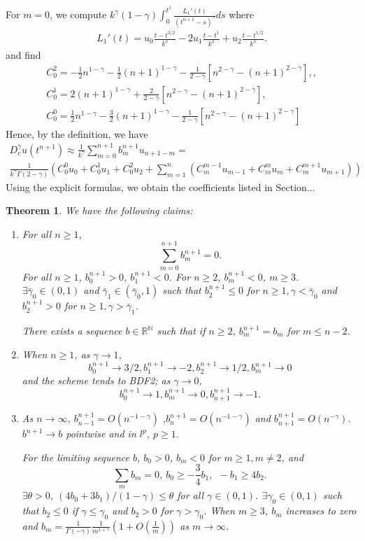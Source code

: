 \documentclass[11pt]{article} %
\newtheorem{thm}{Theorem}
\begin{document}
For $m=0$, we compute $k^{\gamma}(1-\gamma)\int_0^{t^1}\frac{L_1'(t)}{(t^{n+1}-s)^{\gamma}}ds$ where
\begin{gather*}
L_1'(t)=u_{0}\frac{t-t^{3/2}}{k^2}-2u_1\frac{t-t^1}{k^2}+u_{2}\frac{t-t^{1/2}}{k^2}.
\end{gather*}
and find
\begin{gather*}
C_0^2=-\frac{1}{2}n^{1-\gamma}-\frac{1}{2}(n+1)^{1-\gamma}
-\frac{1}{2-\gamma}[n^{2-\gamma}-(n+1)^{2-\gamma}],, \\
C_0^1=2(n+1)^{1-\gamma}
+\frac{2}{2-\gamma}[n^{2-\gamma}-(n+1)^{2-\gamma}], \\
C_0^0=\frac{1}{2}n^{1-\gamma}-\frac{3}{2}(n+1)^{1-\gamma}
-\frac{1}{2-\gamma}[n^{2-\gamma}-(n+1)^{2-\gamma}]
\end{gather*}
Hence, by the definition, we have
\begin{multline*}
D_c^{\gamma}u(t^{n+1})\approx \frac{1}{k^{\gamma}}\sum_{m=0}^{n+1}b_{m}^{n+1}u_{n+1-m}=\\
\frac{1}{k^{\gamma}\Gamma(2-\gamma)}(C_0^0u_0+C_0^1u_1+C_0^2u_2+\sum_{m=1}^n(C_m^{m-1}u_{m-1}
+C_m^{m}u_m+C_m^{m+1}u_{m+1}))
\end{multline*}
Using the explicit formulas, we obtain the coefficients listed in Section...


\begin{thm}
We have the following claims:
\begin{enumerate}
\item 
For all $n\ge 1$, $$
\sum_{m=0}^{n+1}b_m^{n+1}=0.
$$ 
For all $n\ge 1$, $b_0^{n+1}>0$, $b_1^{n+1}<0$. For $n\ge 2$, $b_m^{n+1}<0$, $m\ge 3$. $\exists \bar{\gamma}_0\in (0, 1)$ and $\bar{\gamma}_1\in(\bar{\gamma}_0, 1)$ such that $b_2^{n+1}\le 0$ for $n\ge 1, \gamma<\bar{\gamma}_0$ and $b_2^{n+1}>0$ for $n\ge 1, \gamma>\bar{\gamma}_1$.


There exists a sequence $b\in \mathbb{R}^{\mathbb{N}}$ such that if $n\ge 2$, $b_m^{n+1}=b_m$ for $m\le n-2$.

\item 
When $n\ge 1$, as $\gamma\to 1$, $$
b_0^{n+1}\to 3/2, b_1^{n+1}\to -2, b_2^{n+1}\to 1/2, b_m^{n+1}\to 0
$$
and the scheme tends to BDF2; as $\gamma\to 0$, $$
b_0^{n+1}\to 1, b_m^{n+1}\to 0 ,b_{n+1}^{n+1}\to -1.
$$
\item As $n\to \infty$, $b_{n-1}^{n+1}=O(n^{-1-\gamma})$ ,$b_n^{n+1}=O(n^{-1-\gamma})$ and $b_{n+1}^{n+1}=O(n^{-\gamma})$. $b^{n+1}\to b$ pointwise and in $l^p$, $p\ge 1$. 

For the limiting sequence $b$, $b_0>0$, $b_m<0$
for $m\ge 1, m\neq 2$, and $$
\sum_m b_m=0,\ 
b_0\ge -\frac{3}{4}b_1,\ \ -b_1\ge 4b_2.
$$
$\exists \theta>0$, $(4b_0+3b_1)/(1-\gamma)\le \theta$ for all $\gamma\in (0, 1)$. $\exists\gamma_0\in (0,1)$ such that $b_2\le 0$ if $\gamma\le \gamma_0$ and $b_2>0$ for $\gamma>\gamma_0$. 
When $m\ge 3$, $b_m$ increases to zero and $b_m=\frac{1}{\Gamma(-\gamma)}\frac{1}{m^{1+\gamma}}\left(1+O(\frac{1}{m})\right)$ as $m\to\infty$.
\end{enumerate}
\end{thm}
\end{document}
